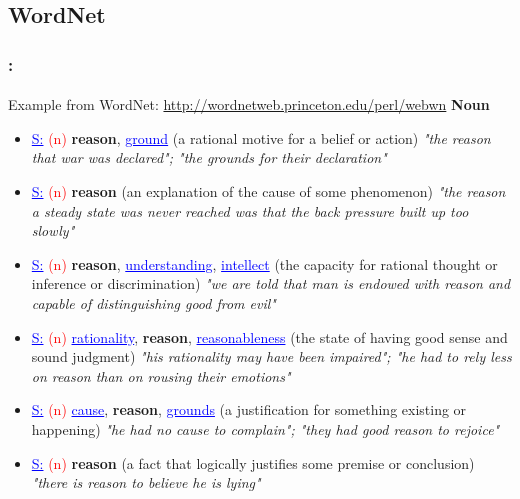 \documentclass[xcolor=table]{beamer}
\begin{document}
\subsection{WordNet}

\begin{frame}
	\frametitle{\insertshortsubtitle: \insertsection}
	\framesubtitle{\insertsubsection}

	\vspace{-6pt}
	\begin{exampleblock}{Example from WordNet: \small\url{http://wordnetweb.princeton.edu/perl/webwn}}
		\fontsize{6}{6}\selectfont
		{\small\bfseries Noun}
		\begin{itemize}\setlength\itemsep{0pt}
			\item \textcolor{blue}{\underline{S:}} \textcolor{red}{(n)} \textbf{reason}, \textcolor{blue}{\underline{ground}} (a rational motive for a belief or action) \textit{"the reason that war was declared"; "the grounds for their declaration"}
			\item \textcolor{blue}{\underline{S:}} \textcolor{red}{(n)} \textbf{reason} (an explanation of the cause of some phenomenon) \textit{"the reason a steady state was never reached was that the back pressure built up too slowly"}
			\item \textcolor{blue}{\underline{S:}} \textcolor{red}{(n)} \textbf{reason}, \textcolor{blue}{\underline{understanding}}, \textcolor{blue}{\underline{intellect}} (the capacity for rational thought or inference or discrimination) \textit{"we are told that man is endowed with reason and capable of distinguishing good from evil"}
			\item \textcolor{blue}{\underline{S:}} \textcolor{red}{(n)} \textcolor{blue}{\underline{rationality}}, \textbf{reason}, \textcolor{blue}{\underline{reasonableness}} (the state of having good sense and sound judgment) \textit{"his rationality may have been impaired"; "he had to rely less on reason than on rousing their emotions"}
			\item \textcolor{blue}{\underline{S:}} \textcolor{red}{(n)} \textcolor{blue}{\underline{cause}}, \textbf{reason}, \textcolor{blue}{\underline{grounds}} (a justification for something existing or happening) \textit{"he had no cause to complain"; "they had good reason to rejoice"}
			\item \textcolor{blue}{\underline{S:}} \textcolor{red}{(n)} \textbf{reason} (a fact that logically justifies some premise or conclusion) \textit{"there is reason to believe he is lying"}
		\end{itemize}
		

\end{exampleblock}
\end{frame}
\end{document}
